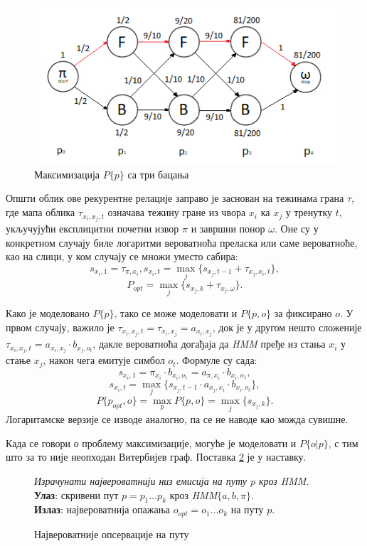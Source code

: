 \documentclass[12pt,oneside]{memoir}
\newenvironment{problem}[1][!ht]
{\renewcommand{\algorithmcfname}{Проблем}
\begin{figure}[!ht]
\centering
  \begin{minipage}{.94\linewidth}
	\begin{algorithm}[#1]%
  }{\end{algorithm}
  \end{minipage}
\end{figure}}
\begin{document}
\begin{CJK}{UTF8}{ipxm}
\begin{figure}[H]
  \centering
  \includegraphics[width=.9\textwidth]{tri_bacanja.png}
  \caption{Максимизација $P\{p\}$ са три бацања}
  \label{fig:tribac}
\end{figure}

Општи облик ове рекурентне релације заправо је заснован на тежинама грана $\tau$, где мапа облика $\tau_{x_i, x_j, t}$ означава тежину гране из чвора $x_i$ ка $x_j$ у тренутку $t$, укључујући експлицитни почетни извор $\pi$ и завршни понор $\omega$. Оне су у конкретном случају биле логаритми вероватноћа преласка или саме вероватноће, као на слици, у ком случају се множи уместо сабира: $$s_{x_i, 1} = \tau_{\pi, x_i}, s_{x_i, t} = \max_j \{s_{x_j, t-1} + \tau_{x_j, x_i, t}\},$$ $$P_{opt} = \max_j \{s_{x_j, k} + \tau_{x_j, \omega}\}.$$

Како је моделовано $P\{p\}$, тако се може моделовати и $P\{p, o\}$ за фиксирано $o$. У првом случају, важило је $\tau_{x_i, x_j, t} = \tau_{x_i, x_j} = a_{x_i, x_j}$, док је у другом нешто сложеније $\tau_{x_i, x_j, t} = a_{x_i, x_j} \cdot b_{x_j, o_t}$, дакле вероватноћа догађаја да \textit{HMM} пређе из стања $x_i$ у стање $x_j$, након чега емитује симбол $o_t$. Формуле су сада: $$s_{x_i, 1} = \pi_{x_i} \cdot b_{x_i, o_1} = a_{\pi, x_i} \cdot b_{x_i, o_1},$$ $$s_{x_i, t} = \max_j \{s_{x_j, t-1} \cdot a_{x_j, x_i} \cdot b_{x_i, o_t}\},$$ $$P\{p_{opt}, o\} = \max_p P\{p, o\} = \max_j \{s_{x_j, k}\}.$$ Логаритамске верзије се изводе аналогно, па се не наводе као можда сувишне.

Када се говори о проблему максимизације, могуће је моделовати и $P\{o | p\}$, с тим што за то није неопходан Витербијев граф. Поставка \ref{prob:maxpops} је у наставку.

\begin{problem}[H]
  \SetAlgoLined
  \textit{Израчунати највероватнији низ емисија на путу $p$ кроз \textit{HMM}.}\\
  \textbf{Улаз}: скривени пут $p = p_1...p_k$ кроз \textit{HMM}$\{a, b, \pi\}$.\\
  \textbf{Излаз}: највероватнија опажања $o_{opt} = o_1...o_k$ на путу $p$.
  \caption{Највероватније опсервације на путу}
  \label{prob:maxpops}
\end{problem}


\end{CJK}
\end{document}
